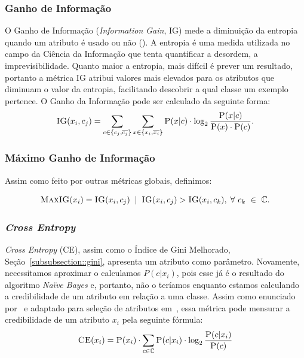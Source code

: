 \subsubsection{Ganho de Informação}
\label{subsubsection::ig}

O Ganho de Informação (\textit{Information Gain}, \textsc{IG}) mede a diminuição da entropia quando um atributo é usado ou não (\cite{Yang97}). A entropia é uma medida utilizada no campo da Ciência da Informação que tenta quantificar a desordem, a imprevisibilidade. Quanto maior a entropia, mais difícil é prever um resultado, portanto a métrica \textsc{IG} atribui valores mais elevados para os atributos que diminuam o valor da entropia, facilitando descobrir a qual classe um exemplo pertence. O Ganho da Informação pode ser calculado da seguinte forma:
\begin{equation}\label{eqn::ig}
 \textsc{IG}(x_i, c_j) = \sum_{c \in \{c_j, \overline{c_j}\}}\sum_{x \in \{x_i, \overline{x_i}\}} \textsc{P}(x|c) \cdot \log_2\frac{\textsc{P}(x|c)}{ \textsc{P}(x) \cdot \textsc{P}(c)}.
\end{equation}

\subsubsection{Máximo Ganho de Informação}
\label{subsubsection::maxig}

Assim como feito por outras métricas globais, definimos:

\begin{equation}\label{eqn::maxdom}
\textsc{MaxIG}(x_i) = \textsc{IG}(x_i,c_j) \; \; | \;\; \textsc{IG}(x_i, c_j) > \textsc{IG}(x_i, c_k), \; \forall\ c_k\ \in\ \mathbb{C}.
\end{equation}

\subsubsection{\textit{Cross Entropy}}
\label{subsubsection::}

\textit{Cross Entropy} (\textsc{CE}), assim como o Índice de Gini Melhorado, Seção~\ref{subsubsection::gini}, apresenta um atributo como parâmetro. Novamente, necessitamos aproximar o calculamos $P(c|x_i)$, pois esse já é o resultado do algoritmo \textit{Naïve Bayes} e, portanto, não o teríamos enquanto estamos calculando a credibilidade de um atributo em relação a uma classe. Assim como enunciado por~\cite{Koller97} e adaptado para seleção de atributos em~\cite{Mladenic98}, essa métrica pode mensurar a credibilidade de um atributo $x_i$ pela seguinte fórmula:
\begin{equation}\label{eqn::ce}
 \textsc{CE}(x_i) =  \textsc{P}(x_i) \cdot \sum_{c \in \mathbb{C}} \textsc{P}(c|x_i) \cdot \log_2 \frac{ \textsc{P}(c|x_i) } {\textsc{P}(c) }
\end{equation}

